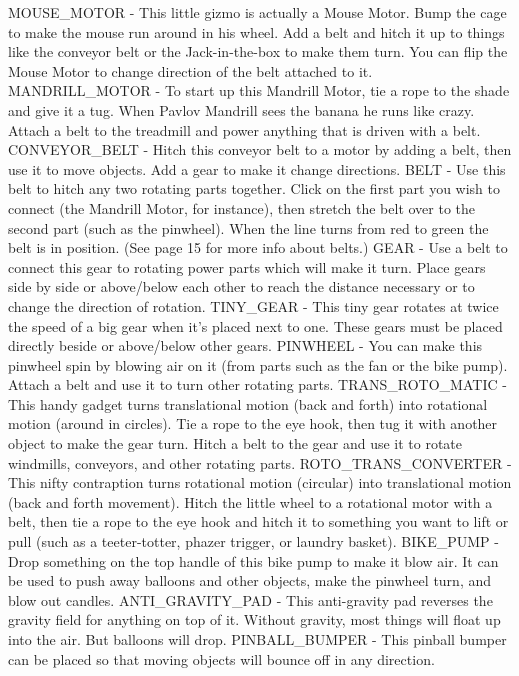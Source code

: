 MOUSE_MOTOR - This little gizmo is actually a Mouse Motor. Bump the cage to make the mouse run around in his wheel. Add a belt and hitch it up to things like the conveyor belt or the Jack-in-the-box to make them turn. You can flip the Mouse Motor to change direction of the belt attached to it.
MANDRILL_MOTOR - To start up this Mandrill Motor, tie a rope to the shade and give it a tug. When Pavlov Mandrill sees the banana he runs like crazy. Attach a belt to the treadmill and power anything that is driven with a belt.
CONVEYOR_BELT - Hitch this conveyor belt to a motor by adding a belt, then use it to move objects. Add a gear to make it change directions.
BELT - Use this belt to hitch any two rotating parts together. Click on the first part you wish to connect (the Mandrill Motor, for instance), then stretch the belt over to the second part (such as the pinwheel). When the line turns from red to green the belt is in position. (See page 15 for more info about belts.)
GEAR - Use a belt to connect this gear to rotating power parts which will make it turn. Place gears side by side or above/below each other to reach the distance necessary or to change the direction of rotation.
TINY_GEAR - This tiny gear rotates at twice the speed of a big gear when it's placed next to one. These gears must be placed directly beside or above/below other gears.
PINWHEEL - You can make this pinwheel spin by blowing air on it (from parts such as the fan or the bike pump). Attach a belt and use it to turn other rotating parts.
TRANS_ROTO_MATIC - This handy gadget turns translational motion (back and forth) into rotational motion (around in circles). Tie a rope to the eye hook, then tug it with another object to make the gear turn. Hitch a belt to the gear and use it to rotate windmills, conveyors, and other rotating parts.
ROTO_TRANS_CONVERTER - This nifty contraption turns rotational motion (circular) into translational motion (back and forth movement). Hitch the little wheel to a rotational motor with a belt, then tie a rope to the eye hook and hitch it to something you want to lift or pull (such as a teeter-totter, phazer trigger, or laundry basket).
BIKE_PUMP - Drop something on the top handle of this bike pump to make it blow air. It can be used to push away balloons and other objects, make the pinwheel turn, and blow out candles.
ANTI_GRAVITY_PAD - This anti-gravity pad reverses the gravity field for anything on top of it. Without gravity, most things will float up into the air. But balloons will drop.
PINBALL_BUMPER - This pinball bumper can be placed so that moving objects will bounce off in any direction.

